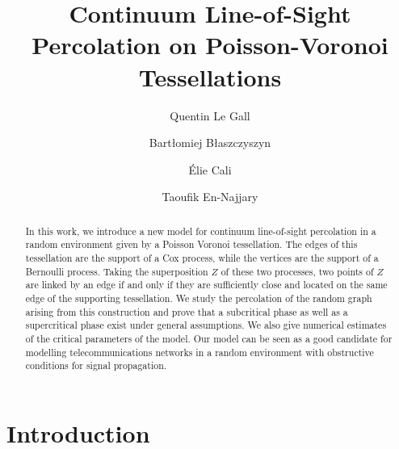 \documentclass[10pt,a4paper]{amsart}
\theoremstyle{exampstyle}
\theoremstyle{exampnotations}
\begin{document}
\title{Continuum Line-of-Sight Percolation on Poisson-Voronoi Tessellations}
\author[Q. Le Gall]{Quentin Le Gall}
\address{Orange Labs Networks, 44 avenue de la République 92320 Ch\^atillon}
\author[B. B\l{}aszczyszyn] {Bart\l{}omiej B\l{}aszczyszyn}
\address{Inria - \MakeUppercase{ens}, 2 rue Simone Iff CS42112 75589 Paris Cedex 12}
\author[E. Cali]{\'Elie Cali}
\address{Orange Labs Networks, 44 avenue de la République 92320 Ch\^atillon}
\author[T. En-Najjary]{Taoufik En-Najjary}
\address{Orange Labs Networks, 44 avenue de la République 92320 Ch\^atillon}
\maketitle
\tableofcontents

\begin{abstract}
   In this work, we introduce a new model for continuum line-of-sight percolation in a random environment given by a Poisson Voronoi tessellation. The edges of this tessellation are the support of a Cox process, while the vertices are the support of a Bernoulli process. Taking the superposition $Z$ of these two processes, two points of $Z$ are linked by an edge if and only if they are sufficiently close and located on the same edge of the supporting tessellation. We study the percolation of the random graph arising from this construction and prove that a subcritical phase as well as a supercritical phase exist under %
   general assumptions. We also give numerical estimates of the critical parameters of the model. Our model can be seen as a good candidate for modelling telecommunications networks in a random environment with obstructive conditions for signal propagation.  
\end{abstract}
\section{Introduction}
\end{document}
